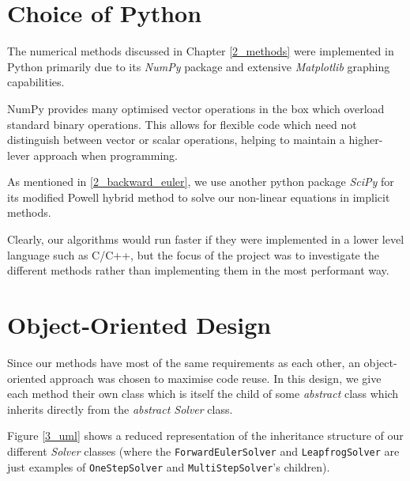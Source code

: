 \documentclass[12pt, twoside]{report}
\theoremstyle{plain}
\theoremstyle{definition}
\theoremstyle{definition}
\begin{document}
    \section{Choice of Python}
    \label{3_python}
        The numerical methods discussed in Chapter \ref{2_methods} were 
        implemented in Python primarily due to its \textit{NumPy} package
        and extensive \textit{Matplotlib} graphing capabilities. 

        NumPy provides many optimised vector operations in the box which 
        overload standard binary operations. This allows for flexible code 
        which need not distinguish between vector or scalar operations, 
        helping to maintain a higher-lever approach when programming.

        As mentioned in \ref{2_backward_euler}, we use another python package
        \textit{SciPy} for its modified Powell hybrid method to solve our
        non-linear equations in implicit methods. 

        Clearly, our algorithms would run faster if they were implemented in a
        lower level language such as C/C++, but the focus of the project was to
        investigate the different methods rather than implementing them in the 
        most performant way. 


    \section{Object-Oriented Design}
    \label{3_oo}
        Since our methods have most of the same requirements as each other, an 
        object-oriented approach was chosen to maximise code reuse. In this 
        design, we give each method their own class which is itself the child 
        of some \textit{abstract} class which inherits directly from the 
        \textit{abstract Solver} class. 

        Figure \ref{3_uml} shows a reduced representation of the inheritance
        structure of our different \textit{Solver} classes (where the 
        \texttt{ForwardEulerSolver} and 
        \texttt{LeapfrogSolver} are just examples of 
        \texttt{OneStepSolver} and 
        \texttt{MultiStepSolver}'s children). 
\end{document}
